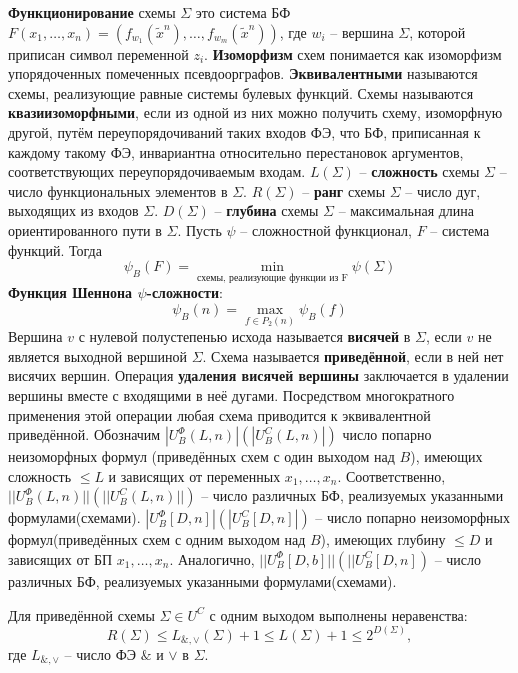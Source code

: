 \documentclass[11pt]{article}
\newcounter{th}\setcounter{th}{0}
\newcounter{stnmt}\setcounter{stnmt}{0}
\def\st{\par\smallskip\refstepcounter{stnmt}\textbf{\arabic{stnmt}}}
\newtheorem*{Statement}{Утверждение \st}
\begin{document}
\textbf{Функционирование} схемы \(\Sigma\) это система БФ
\(F(x_1, \ldots, x_n) = (f_{w_1}(\tilde{x}^n), \ldots, f_{w_m}(\tilde{x}^n))\), где \(w_i\) --
вершина \(\Sigma\), которой приписан символ переменной \(z_i\).
\textbf{Изоморфизм} схем понимается как изоморфизм упорядоченных помеченных псевдоорграфов.
\textbf{Эквивалентными} называются схемы, реализующие равные системы булевых функций. Схемы называются
\textbf{квазиизоморфными}, если из одной из них можно получить схему, изоморфную другой, путём
переупорядочиваний таких входов ФЭ, что БФ, приписанная к каждому такому ФЭ, инвариантна
относительно перестановок аргументов, соответствующих переупорядочиваемым входам.
\(L(\Sigma)\) -- \textbf{сложность} схемы \(\Sigma\) -- число функциональных элементов в \(\Sigma\).
\(R(\Sigma)\) -- \textbf{ранг} схемы \(\Sigma\) -- число дуг, выходящих из входов \(\Sigma\).
\(D(\Sigma)\) -- \textbf{глубина} схемы \(\Sigma\) -- максимальная длина ориентированного пути в \(\Sigma\).
Пусть \(\psi\) -- сложностной функционал, \(F\) -- система функций. Тогда
\begin{equation}
\psi_B(F) = \min_{\text{схемы, реализующие функции из F}}\psi(\Sigma)
\end{equation}
\textbf{Функция Шеннона \(\psi\)-сложности}:
\begin{equation}
\psi_B(n) = \max_{f \in P_2(n)}\psi_B(f)
\end{equation}
Вершина \(v\) с нулевой полустепенью исхода называется \textbf{висячей} в \(\Sigma\), если \(v\) не является
выходной вершиной \(\Sigma\). Схема называется \textbf{приведённой}, если в ней нет висячих вершин.
Операция \textbf{удаления висячей вершины} заключается в удалении вершины вместе с входящими в неё
дугами. Посредством многократного применения этой операции любая схема приводится к эквивалентной
приведённой. Обозначим \(|U_B^{\Phi}(L, n)|(|U_B^C(L, n)|)\) число попарно неизоморфных формул
(приведённых схем с один выходом над \(B\)), имеющих сложность \(\leq L\) и зависящих от переменных
\(x_1, \ldots, x_n\). Соответственно, \(||U_B^{\Phi}(L, n)||(||U_B^C(L, n)||)\) -- число различных
БФ, реализуемых указанными формулами(схемами). \(|U_B^{\Phi}[D, n]|(|U_B^C[D, n]|)\) -- число попарно
неизоморфных формул(приведённых схем с одним выходом над \(B\)), имеющих глубину \(\leq D\) и
зависящих от БП \(x_1, \ldots, x_n\). Аналогично, \(||U_B^{\Phi}[D, b]||(||U_B^C[D, n])\) -- число
различных БФ, реализуемых указанными формулами(схемами).
\begin{Statement}
Для приведённой схемы $\Sigma \in U^C$ с одним выходом выполнены неравенства:
\begin{equation}
R(\Sigma) \leq L_{\&, \vee}(\Sigma) + 1 \leq L(\Sigma) + 1 \leq 2^{D(\Sigma)},
\end{equation}
где $L_{\&, \vee}$ -- число ФЭ $\&$ и $\vee$ в $\Sigma$.
\end{Statement}
\end{document}

